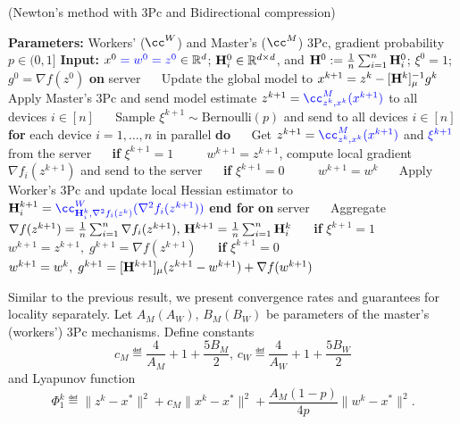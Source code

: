 \documentclass[11pt]{article}
\begin{document}
	\begin{algorithm}[h]
		\caption{ (Newton's method with {\color{blue}3Pc} and {\color{blue}Bidirectional compression)}}
		\label{alg:N3Pc-Bc}
		\begin{algorithmic}[1]
			\STATE \textbf{Parameters:} {\color{blue} Workers' ($\cc^W$) and Master's ($\cc^M$) 3Pc, gradient probability $p\in(0,1]$}
			\STATE \textbf{Input:} $x^0\;{\color{blue}=w^0=z^0}\in\mathbb{R}^d$;  $\mathbf{H}_i^0 \in \mathbb{R}^{d\times d}$, and $\mathbf{H}^0 \; { := }\; \tfrac{1}{n}\sum_{i=1}^n \mathbf{H}_i^0$; {\color{blue}$\xi^0 = 1$}; $g^0 = \nabla f(z^0)$
			\STATE \textbf{on} server
			\STATE ~~ Update the global model to $x^{k+1} = z^k - [\mathbf{H}^k]_{\mu}^{-1} g^k$
			\STATE ~~ Apply {\color{blue} Master's 3Pc} and send model estimate $z^{k+1} = {\color{blue}\cc^M_{z^k, x^k} (x^{k+1})}$ to all devices $i\in[n]$
			\STATE ~~ {\color{blue}Sample $\xi^{k+1} \sim \text{Bernoulli}(p)$ and send to all devices $i\in[n]$}
			\STATE \textbf{for} each device $i = 1, \dots, n$ in parallel \textbf{do}
			\STATE ~~ Get $z^{k+1} = {\color{blue}\cc^M_{z^k, x^k} (x^{k+1})}$ and ${\color{blue}\xi^{k+1}}$ from the server
			\STATE ~~ \textbf{if} {\color{blue}$\xi^{k+1} = 1$}
			\STATE ~~~~ $ w^{k+1} = z^{k+1}$, compute local gradient $\nabla f_i(z^{k+1})$ and send to the server
			\STATE ~~ \textbf{if} {\color{blue}$\xi^{k+1} = 0$}
			\STATE ~~~~ $w^{k+1} = w^k$
			\STATE ~~ Apply {\color{blue}Worker's 3Pc} and update local Hessian estimator to $\mH_i^{k+1} = {\color{blue}\cc^W_{\mH_i^k, \nabla^2 f_i(z^{k})} (\nabla^2 f_i(z^{k+1}))}$
			\STATE \textbf{end for}
			\STATE \textbf{on} server
			\STATE ~~ Aggregate $\nabla f(z^{k+1}) = \frac{1}{n}\sum_{i=1}^n \nabla f_i(z^{k+1}),\, \mathbf{H}^{k+1} = \frac{1}{n} \sum_{i=1}^n \mathbf{H}_i^k$
			\STATE ~~ \textbf{if} {\color{blue}$\xi^{k+1} = 1$}
			\STATE ~~~~ $w^{k+1} = z^{k+1},\; g^{k+1} = \nabla f(z^{k+1})$
			\STATE ~~ \textbf{if} {\color{blue}$\xi^{k+1} = 0$}
			\STATE ~~~~ $w^{k+1} = w^k,\; g^{k+1} = [\mathbf{H}^{k+1}]_{\mu}(z^{k+1}-w^{k+1}) + \nabla f(w^{k+1})$ 
		\end{algorithmic}
	\end{algorithm}
	
	Similar to the previous result, we present convergence rates and guarantees for locality separately. Let $A_M (A_W),\, B_M (B_W)$ be parameters of the master's (workers') 3Pc mechanisms. Define constants $$c_M \eqdef  \frac{4}{A_M} + 1 + \frac{5B_M}{2},\, c_W \eqdef  \frac{4}{A_W} + 1 + \frac{5B_W}{2}$$ and Lyapunov function $$\Phi_1^k \eqdef \|z^k-x^*\|^2 + c_M\|x^k-x^*\|^2 + \frac{A_M(1-p)}{4p} \|w^k-x^*\|^2.$$
	
\end{document}
